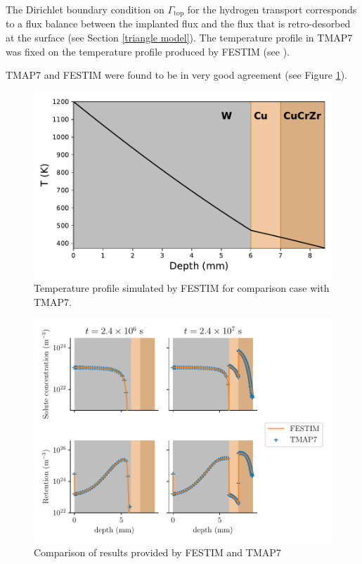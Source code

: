The Dirichlet boundary condition on $\Gamma_\mathrm{top}$ for the hydrogen transport corresponds to a flux balance between the implanted flux and the flux that is retro-desorbed at the surface (see Section \ref{triangle model}).
The temperature profile in TMAP7 was fixed on the temperature profile produced by FESTIM (see ).

TMAP7 and FESTIM were found to be in very good agreement (see Figure \ref{fig: code comparison}).

\begin{figure} [h]
    \centering
    \includegraphics[width=0.5\linewidth]{Figures/Chapter3/monoblocks/interface_condition/iter case/temperature_1D.pdf}
    \caption{Temperature profile simulated by FESTIM for comparison case with TMAP7.}
\end{figure}

\begin{figure} [h]
    \centering
    \includegraphics[width=\linewidth]{Figures/Chapter3/monoblocks/interface_condition/iter case/comparison_codes.pdf}
    \caption{Comparison of results provided by FESTIM and TMAP7}
    \label{fig: code comparison}
\end{figure}

